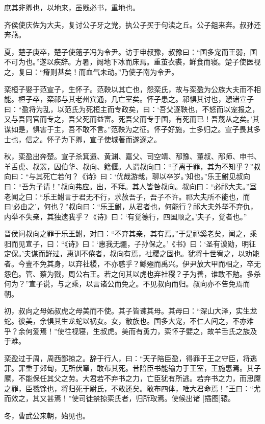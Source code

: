 \documentclass[a4paper,12pt,UTF8,twoside]{ctexbook}
\begin{document}
庶其非卿也，以地来，虽贱必书，重地也。

齐侯使庆佐为大夫，复讨公子牙之党，执公子买于句渎之丘。公子鉏来奔。叔孙还奔燕。

夏，楚子庚卒，楚子使薳子冯为令尹。访于申叔豫，叔豫曰：“国多宠而王弱，国不可为也。”遂以疾辞。方暑，阙地下冰而床焉。重茧衣裘，鲜食而寝。楚子使医视之，复曰：“瘠则甚矣！而血气未动。”乃使子南为令尹。

栾桓子娶于范宣子，生怀子。范鞅以其亡也，怨栾氏，故与栾盈为公族大夫而不相能。桓子卒，栾祁与其老州宾通，几亡室矣。怀子患之。祁惧其讨也，愬诸宣子曰：“盈将为乱，以范氏为死桓主而专政矣，曰：‘吾父逐鞅也，不怒而以宠报之，又与吾同官而专之，吾父死而益富。死吾父而专于国，有死而已！吾蔑从之矣。’其谋如是，惧害于主，吾不敢不言。”范鞅为之征。怀子好施，士多归之。宣子畏其多士也，信之。怀子为下卿，宣子使城著而遂逐之。

秋，栾盈出奔楚。宣子杀箕遗、黄渊、嘉父、司空靖、邴豫、董叔、邴师、申书、羊舌虎、叔罴，囚伯华、叔向、籍偃。人谓叔向曰：“子离于罪，其为不知乎？”叔向曰：“与其死亡若何？《诗》曰：‘优哉游哉，聊以卒岁。’知也。”乐王鲋见叔向曰：“吾为子请！”叔向弗应。出，不拜。其人皆咎叔向。叔向曰：“必祁大夫。”室老闻之曰：“乐王鲋言于君无不行，求赦吾子，吾子不许。祁大夫所不能也，而曰‘必由之’，何也？”叔向曰：“乐王鲋，从君者也，何能行？祁大夫外举不弃仇，内举不失亲，其独遗我乎？《诗》曰：‘有觉德行，四国顺之。’夫子，觉者也。”

晋侯问叔向之罪于乐王鲋，对曰：“不弃其亲，其有焉。”于是祁奚老矣，闻之，乘驲而见宣子，曰：“《诗》曰：‘惠我无疆，子孙保之。’《书》曰：‘圣有谟勋，明征定保。’夫谋而鲜过，惠训不倦者，叔向有焉，社稷之固也。犹将十世宥之，以劝能者。今壹不免其身，以弃社稷，不亦惑乎？鲧殛而禹兴。伊尹放大甲而相之，卒无怨色。管、蔡为戮，周公右王。若之何其以虎也弃社稷？子为善，谁敢不勉。多杀何为？”宣子说，与之乘，以言诸公而免之。不见叔向而归。叔向亦不告免焉而朝。

初，叔向之母妬叔虎之母美而不使。其子皆谏其母。其母曰：“深山大泽，实生龙蛇。彼美，余惧其生龙蛇以祸女。女，敝族也。国多大宠，不仁人间之，不亦难乎？余何爱焉！”使往视寝，生叔虎。美而有勇力，栾怀子嬖之，故羊舌氏之族及于难。

栾盈过于周，周西鄙掠之。辞于行人，曰：“天子陪臣盈，得罪于王之守臣，将逃罪。罪重于郊甸，无所伏窜，敢布其死。昔陪臣书能输力于王室，王施惠焉。其子黡，不能保任其父之劳。大君若不弃书之力，亡臣犹有所逃。若弃书之力，而思黡之罪，臣戮馀也，将归死于尉氏，不敢还矣。敢布四体，唯大君命焉！”王曰：“尤而效之，其又甚焉！”使司徒禁掠栾氏者，归所取焉。使候出诸 [插图]辕。

冬，曹武公来朝，始见也。
\end{document}

